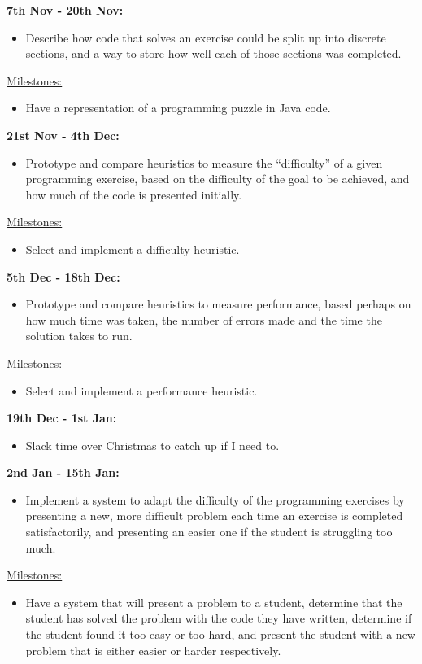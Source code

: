 \documentclass[12pt,a4paper,twoside]{article}
\begin{document}
\textbf{7th Nov - 20th Nov:}
\begin{itemize}
\item{Describe how code that solves an exercise could be split up into discrete sections, and a way to store how well each of those sections was completed.}
\end{itemize}
\underline{Milestones:}
\begin{itemize}
\item{Have a representation of a programming puzzle in Java code.}
\end{itemize}

\textbf{21st Nov - 4th Dec:}
\begin{itemize}
\item{Prototype and compare heuristics to measure the ``difficulty'' of a given programming exercise, based on the difficulty of the goal to be achieved, and how much of the code is presented initially.}
\end{itemize}
\underline{Milestones:}
\begin{itemize}
\item{Select and implement a difficulty heuristic.}
\end{itemize}

\textbf{5th Dec - 18th Dec:}
\begin{itemize}
\item{Prototype and compare heuristics to measure performance, based perhaps on how much time was taken, the number of errors made and the time the solution takes to run.}
\end{itemize}
\underline{Milestones:}
\begin{itemize}
\item{Select and implement a performance heuristic.}
\end{itemize}

\textbf{19th Dec - 1st Jan:}
\begin{itemize}
\item{Slack time over Christmas to catch up if I need to.}
\end{itemize}

\textbf{2nd Jan - 15th Jan:}
\begin{itemize}
\item{Implement a system to adapt the difficulty of the programming exercises by presenting a new, more difficult problem each time an exercise is completed satisfactorily, and presenting an easier one if the student is struggling too much.}
\end{itemize}
\underline{Milestones:}
\begin{itemize}
\item{Have a system that will present a problem to a student, determine that the student has solved the problem with the code they have written, determine if the student found it too easy or too hard, and present the student with a new problem that is either easier or harder respectively.}
\end{itemize}
\end{document}
